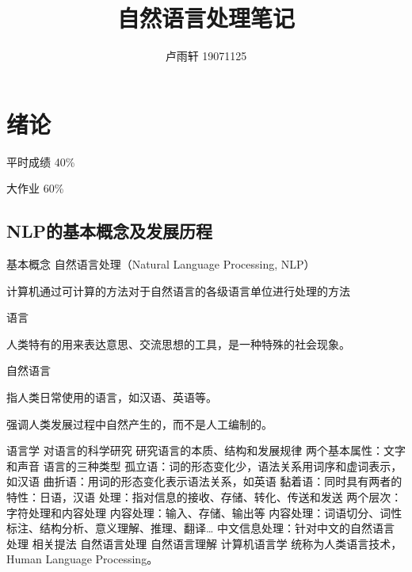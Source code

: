 \documentclass{ctexart}
\title{自然语言处理笔记}
\author{卢雨轩 19071125}
\begin{document}
\maketitle

\section{绪论}
平时成绩 40\%

大作业 60\%

\subsection{NLP的基本概念及发展历程}
\begin{outline}
    \1 基本概念
        \2 自然语言处理（Natural Language Processing, NLP）

            计算机通过可计算的方法对于自然语言的各级语言单位进行处理的方法

        \2 语言
        
            人类特有的用来表达意思、交流思想的工具，是一种特殊的社会现象。
        
        \2 自然语言

            指人类日常使用的语言，如汉语、英语等。

            强调人类发展过程中自然产生的，而不是人工编制的。
        
        \2 语言学 
            \3 对语言的科学研究
            \3 研究语言的本质、结构和发展规律
            \3 两个基本属性：文字和声音
        \2 语言的三种类型
            \3 孤立语：词的形态变化少，语法关系用词序和虚词表示，如汉语
            \3 曲折语：用词的形态变化表示语法关系，如英语
            \3 黏着语：同时具有两者的特性：日语，汉语
        \2 处理：指对信息的接收、存储、转化、传送和发送
            \3 两个层次：字符处理和内容处理
            \3 内容处理：输入、存储、输出等
            \3 内容处理：词语切分、词性标注、结构分析、意义理解、推理、翻译\dots
        \2 中文信息处理：针对中文的自然语言处理
    \1 相关提法
        \2 自然语言处理
        \2 自然语言理解
        \2 计算机语言学
        \2 统称为人类语言技术，Human Language Processing。
\end{outline}
\end{document}
